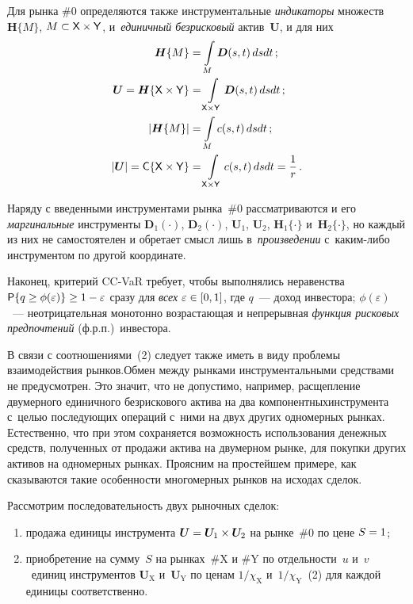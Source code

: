 \begin{multicols}{2}
  Для рынка \#0 определяются также инструментальные \textit{индикаторы} 
множеств $\boldsymbol{H}\{M\}$, $M \hm\subset {\sf X}\times{\sf Y}$, 
и~\textit{единичный безрисковый} актив~$\boldsymbol{U}$, и для них 
  \begin{align*}
  \boldsymbol{H}\{M\} &=\int\limits_M \boldsymbol{D}(s,t)\,dsdt\,;\\
  \boldsymbol{U}=\boldsymbol{H}\{{\sf X}\times {\sf Y}\} &=\int\limits_{{\sf 
X}\times{\sf Y}} \boldsymbol{D}(s,t)\,dsdt\,;\\
  \left\vert \boldsymbol{H}\{M\}\right\vert
  & =\int\limits_M c(s,t)\,dsdt\,;\\
     \vert \boldsymbol{U}\vert ={\sf C}\{{\sf X}\times {\sf Y}\}& =\int\limits_{{\sf 
X}\times{\sf Y}} c(s,t)\,dsdt =\displaystyle\frac{\displaystyle 1\mathstrut}{\displaystyle r\mathstrut}\,.
  \end{align*}
  
  Наряду с введенными инструментами рынка~\#0 рассматриваются и его 
\textit{маргинальные} инструменты $\boldsymbol{D}_1(\cdot)$, 
$\boldsymbol{D}_2(\cdot)$, $\boldsymbol{U}_1$, $\boldsymbol{U}_2$, 
$\boldsymbol{H}_1\{\cdot\}$ и~$\boldsymbol{H}_2\{\cdot\}$, но каждый из них не 
самостоятелен и обретает смысл лишь в~\textit{произведении}  
с~ка\-ким-ли\-бо инструментом по другой координате.
  
  Наконец, критерий CC-VaR требует, чтобы выполнялись неравенства 
   ${\sf P}\{q\geq\phi(\varepsilon)\}\hm\geq 1\hm-\varepsilon$ сразу для \textit{всех} 
$\varepsilon \hm\in  [0, 1]$,
где $q$~--- доход инвестора; $\phi(\varepsilon)$~--- неотрицательная монотонно 
возрастающая и непрерывная \textit{функция рисковых предпочтений} (ф.р.п.)\ 
инвестора. 

  В связи с соотношениями~(2) следует также иметь в виду проблемы 
взаимодействия рынков.\linebreak Обмен между рынками инструментальными 
средствами не предусмотрен. Это значит, что не допус\-ти\-мо, например, 
расщепление двумерного единичного безрискового актива на два 
компонентных\linebreak инструмента с~целью последующих операций с~ними на двух 
других одномерных рынках. Естественно, что при этом сохраняется 
возможность использования денежных средств, полученных от продажи актива 
на двумерном рынке, для покупки других активов на одномерных рынках. 
Проясним на простейшем примере, как сказываются такие особенности 
многомерных рынков на исходах сделок. 
  
  Рассмотрим последовательность двух рыночных сделок: 
  \begin{enumerate}[(1)]
  \item продажа единицы инструмента $\boldsymbol{U}\hm= 
\boldsymbol{U}_1\times \boldsymbol{U}_2$ на рынке~\#0 по цене $S \hm= 1$; 
  \item приобретение на сумму~$S$ на рынках~\#X и \#Y по отдельности~$u$ 
и~$v$~единиц инструментов $\boldsymbol{U}_{\mathrm{X}}$ 
и~$\boldsymbol{U}_{\mathrm{Y}}$ по ценам $1/\chi_{\mathrm{X}}$ 
и~$1/\chi_{\mathrm{Y}}$~(2) для каждой единицы соответственно. 
  \end{enumerate}
  

\end{multicols}
